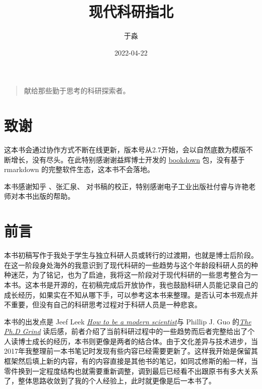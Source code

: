 \documentclass[]{tufte-book}
\title{现代科研指北}
\author{于淼}
\date{2022-04-22}
\begin{document}
\maketitle



{
\setcounter{tocdepth}{1}
\tableofcontents
}

\begin{quote}
献给那些勤于思考的科研探索者。
\end{quote}

\hypertarget{ux81f4ux8c22}{%
\chapter*{致谢}\label{ux81f4ux8c22}}

这本书会通过协作方式不断在线更新，版本号从2.7开始，会以自然底数为模版不断增长，没有尽头。在此特别感谢谢益辉博士开发的 \href{https://bookdown.org/yihui/bookdown/}{bookdown} 包，没有基于 rmarkdown 的完整软件生态，这本书不会落地。

本书感谢知乎 \citet{羲洁}、张汇泉、 \citet{wogong} 对书稿的校正，特别感谢电子工业出版社付睿与许艳老师对本书出版的帮助。

\hypertarget{intro}{%
\chapter{前言}\label{intro}}

本书初稿写作于我处于学生与独立科研人员或转行的过渡期，也就是博士后阶段。在这一阶段身处海外的我意识到了现代科研的一些趋势与这个年龄段科研人员的种种迷茫，为了铭记，也为了启迪，我将这一阶段对于现代科研的一些思考整合为一本书。这本书是开源的，在初稿完成后开放协作，我也鼓励科研人员能记录自己的成长经历，如果实在不知从哪下手，可以参考这本书来整理。是否认可本书观点并不重要，但没有自己的科研思考过程对于科研人员是一种悲哀。

本书的出发点是 Jeef Leek \href{https://leanpub.com/modernscientist}{\emph{How to be a modern scientist}}与 Phillip J. Guo 的\href{https://www.goodreads.com/en/book/show/15731248-the-ph-d-grind}{\emph{The Ph.D Grind}} 读后感，前者介绍了当前科研过程中的一些趋势而后者完整给出了个人读博士成长的经历，本书则更像是两者的结合体。由于文化差异与技术进步，当2017年我整理前一本书笔记时发现有些内容已经需要更新了。这样我开始是保留其框架然后填上新的内容，有的内容直接是其他书的笔记，如同忒修斯的船一样，当零件换到一定程度结构也就需要重新调整，调到最后已经看不出跟原书有多大关系了，整体思路收敛到了我的个人经验上，此时就更像是后一本书了。
\end{document}

